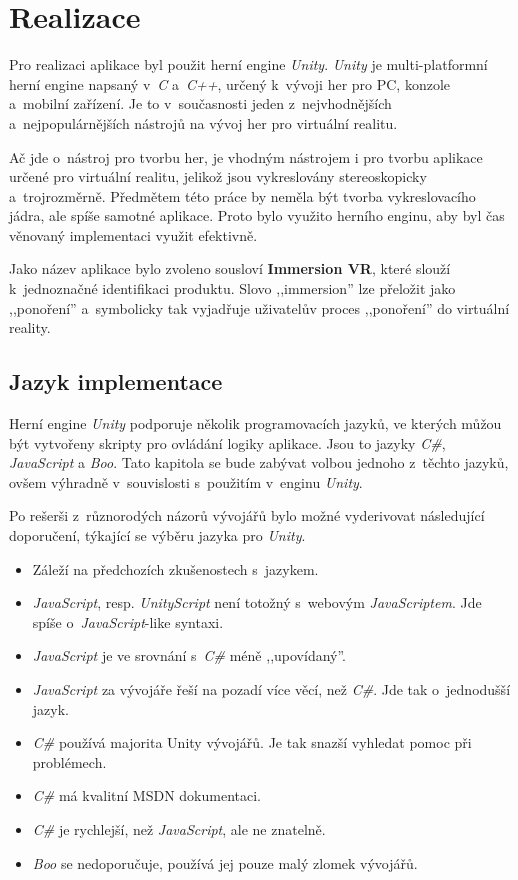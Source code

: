 \chapter{Realizace}\label{realizace}

Pro realizaci aplikace byl použit herní engine \emph{Unity}.
\emph{Unity} je multi-platformní herní engine napsaný v~\emph{C} a~\emph{C++}, určený
k~vývoji her pro PC, konzole a~mobilní zařízení. Je to v~současnosti
jeden z~nejvhodnějších a~nejpopulárnějších nástrojů na vývoj her pro
virtuální realitu. \autocite{unitypopularity}

Ač jde o~nástroj pro tvorbu her, je vhodným nástrojem i pro tvorbu
aplikace určené pro virtuální realitu, jelikož jsou vykreslovány 
stereoskopicky a~trojrozměrně. Předmětem této práce by neměla 
být tvorba vykreslovacího jádra, ale spíše samotné aplikace. 
Proto bylo využito herního enginu, aby byl čas
věnovaný implementaci využit efektivně.

Jako název aplikace bylo zvoleno sousloví \textbf{Immersion VR}, které
slouží k~jednoznačné identifikaci produktu. Slovo ,,immersion'' lze
přeložit jako ,,ponoření'' a~symbolicky tak vyjadřuje uživatelův proces
,,ponoření'' do virtuální reality.

\section{Jazyk implementace}\label{jazyk-implementace}

Herní engine \emph{Unity} podporuje několik programovacích jazyků, ve
kterých můžou být vytvořeny skripty pro ovládání logiky aplikace. Jsou
to jazyky \emph{C\#}, \emph{JavaScript} a \emph{Boo}. \autocite{unitylanguages} Tato kapitola se
bude zabývat volbou jednoho z~těchto jazyků, ovšem výhradně
v~souvislosti s~použitím v~enginu \emph{Unity}.

Po rešerši z~různorodých názorů vývojářů bylo možné vyderivovat
následující doporučení, týkající se výběru jazyka pro \emph{Unity}. \autocite{languagesresearch1} \autocite{languagesresearch2} \autocite{languagesresearch3}

\begin{itemize}
\tightlist
\item
  Záleží na předchozích zkušenostech s~jazykem.
\item
  \emph{JavaScript}, resp. \emph{UnityScript} není totožný s~webovým \emph{JavaScriptem}. Jde
  spíše o~\emph{JavaScript}-like syntaxi.
\item
  \emph{JavaScript} je ve srovnání s~\emph{C\#} méně ,,upovídaný''.
\item
  \emph{JavaScript} za vývojáře řeší na pozadí více věcí, než \emph{C\#}. Jde tak
o~jednodušší jazyk.
\item
  \emph{C\#} používá majorita Unity vývojářů. Je tak snazší vyhledat pomoc při
  problémech.
\item
  \emph{C\#} má kvalitní MSDN dokumentaci.
\item
  \emph{C\#} je rychlejší, než \emph{JavaScript}, ale ne znatelně.
\item
  \emph{Boo} se nedoporučuje, používá jej pouze malý zlomek vývojářů.
\end{itemize}

